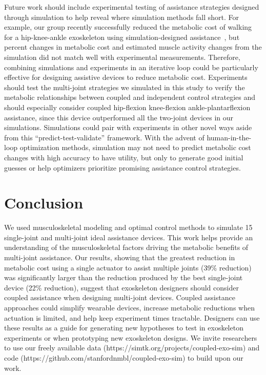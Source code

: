 \documentclass[10pt,letterpaper]{article}
\begin{document}
Future work should include experimental testing of assistance strategies designed through simulation to help reveal where simulation methods fall short. For example, our group recently successfully reduced the metabolic cost of walking for a hip-knee-ankle exoskeleton using simulation-designed assistance~\cite{Franks:2020}, but percent changes in metabolic cost and estimated muscle activity changes from the simulation did not match well with experimental measurements. Therefore, combining simulations and experiments in an iterative loop could be particularly effective for designing assistive devices to reduce metabolic cost. Experiments should test the multi-joint strategies we simulated in this study to verify the metabolic relationships between coupled and independent control strategies and should especially consider coupled hip-flexion knee-flexion ankle-plantarflexion assistance, since this device outperformed all the two-joint devices in our simulations. Simulations could pair with experiments in other novel ways aside from this ``predict-test-validate'' framework. With the advent of human-in-the-loop optimization methods, simulation may not need to predict metabolic cost changes with high accuracy to have utility, but only to generate good initial guesses or help optimizers prioritize promising assistance control strategies.

\section*{Conclusion}
We used musculoskeletal modeling and optimal control methods to simulate 15 single-joint and multi-joint ideal assistance devices. This work helps provide an understanding of the musculoskeletal factors driving the metabolic benefits of multi-joint assistance. Our results, showing that the greatest reduction in metabolic cost using a single actuator to assist multiple joints (39\% reduction) was significantly larger than the reduction produced by the best single-joint device (22\% reduction), suggest that exoskeleton designers should consider coupled assistance when designing multi-joint devices. Coupled assistance approaches could simplify wearable devices, increase metabolic reductions when actuation is limited, and help keep experiment times tractable. Designers can use these results as a guide for generating new hypotheses to test in exoskeleton experiments or when prototyping new exoskeleton designs. We invite researchers to use our freely available data (https://simtk.org/projects/coupled-exo-sim) and code (https://github.com/stanfordnmbl/coupled-exo-sim) to build upon our work.
\end{document}
